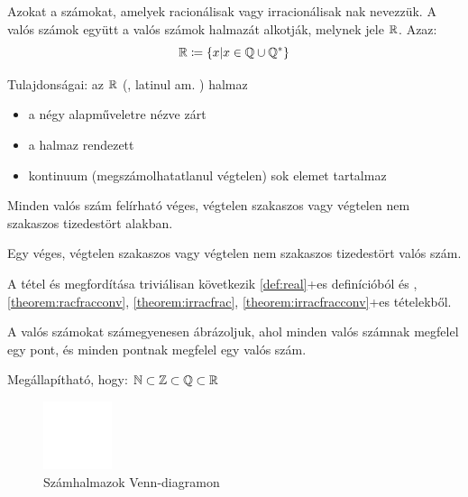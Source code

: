\begin{defin2}
\label{def:real}
Azokat a számokat, amelyek racionálisak vagy irracionálisak nak nevezzük. A valós számok együtt a valós számok halmazát alkotják,
melynek jele $\mathbb{R}$. Azaz:
\[
  \mathbb{R} \coloneqq \{x | x \in \mathbb{Q} \cup \mathbb{Q^*}\}
\]

Tulajdonságai: az $\mathbb{R}$ (, latinul am. )
halmaz
\begin{itemize}
\item a négy alapműveletre nézve zárt
\item a halmaz rendezett
\item kontinuum (megszámolhatatlanul végtelen) sok elemet tartalmaz
\end{itemize}
\end{defin2}

\begin{theorem2}
Minden valós szám felírható véges, végtelen szakaszos vagy végtelen nem
szakaszos tizedestört alakban.
\end{theorem2}

\begin{theoremconv2}
Egy véges, végtelen szakaszos vagy végtelen nem szakaszos tizedestört  valós
szám.
\end{theoremconv2}

\begin{proof2}
A tétel és megfordítása triviálisan következik \atold\ref{def:real}+es{}
definícióból és , \ref{theorem:racfracconv},
\ref{theorem:irracfrac}, \told\ref{theorem:irracfracconv}+es{} tételekből.
\end{proof2}

\begin{note2}
A valós számokat számegyenesen ábrázoljuk, ahol minden valós számnak megfelel
egy pont, és minden pontnak megfelel egy valós szám.
\end{note2}

\begin{note2}
Megállapítható, hogy:
$\mathbb{N} \subset \mathbb{Z} \subset \mathbb{Q} \subset \mathbb{R}$

\begin{figure}[!h]
	\centering
	\includegraphics[height=2cm]{../images/padder}
	\caption{Számhalmazok Venn-diagramon} 
	\label{fig:numberset}
\end{figure}
\end{note2}

